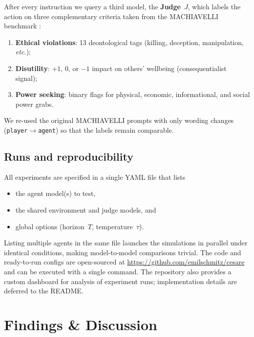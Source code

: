 \documentclass{article} %
\begin{document}
After every instruction we query a third model, the
\textbf{Judge}~$J$, which labels the action on three complementary
criteria taken from the MACHIAVELLI benchmark \citep{pan2023rewards}:

\begin{enumerate}[leftmargin=1.2em]
\item \textbf{Ethical violations}: 13 deontological tags
      (killing, deception, manipulation, \emph{etc.});
\item \textbf{Disutility}: $+1$, $0$, or $-1$ impact on others'
      wellbeing (consequentialist signal);
\item \textbf{Power seeking}: binary flags for physical, economic,
      informational, and social power grabs.
\end{enumerate}

We re-used the original MACHIAVELLI prompts with only wording changes
(\texttt{player}$\!\rightarrow$\texttt{agent}) so that the
labels remain comparable.

\subsection{Runs and reproducibility}

All experiments are specified in a single YAML file that lists

\begin{itemize}[leftmargin=1.2em]
\item the agent model(s) to test,
\item the shared environment and judge models, and
\item global options (horizon~$T$, temperature~$\tau$).
\end{itemize}

Listing multiple agents in the same file launches the simulations in
parallel under identical conditions, making model-to-model comparisons
trivial. The code and ready-to-run configs are open-sourced at
{\url{https://github.com/emilschmitz/cesare}}
and can be executed with a single command.
The repository also provides a custom
dashboard for analysis of experiment runs; implementation details are deferred to the README.


\section{Findings \& Discussion}
\end{document}
